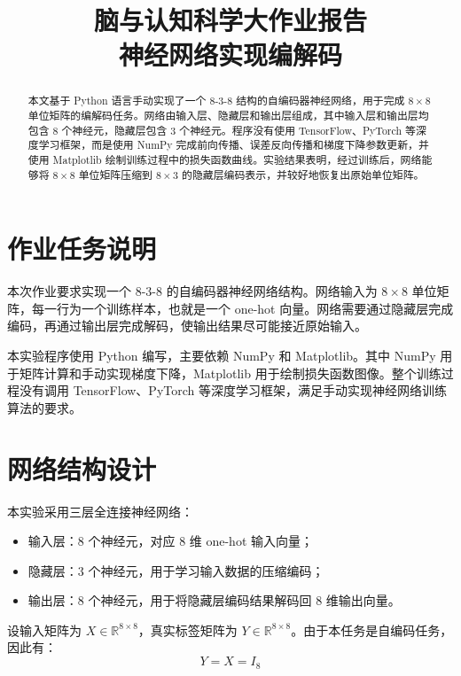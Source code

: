 \documentclass[UTF8,a4paper,12pt]{ctexart}
\title{\textbf{脑与认知科学大作业报告}\\神经网络实现编解码}
\date{}
\begin{document}
\maketitle
\newpage
\begin{abstract}
本文基于 Python 语言手动实现了一个 $8$-$3$-$8$ 结构的自编码器神经网络，用于完成 $8 \times 8$ 单位矩阵的编解码任务。网络由输入层、隐藏层和输出层组成，其中输入层和输出层均包含 $8$ 个神经元，隐藏层包含 $3$ 个神经元。程序没有使用 TensorFlow、PyTorch 等深度学习框架，而是使用 NumPy 完成前向传播、误差反向传播和梯度下降参数更新，并使用 Matplotlib 绘制训练过程中的损失函数曲线。实验结果表明，经过训练后，网络能够将 $8 \times 8$ 单位矩阵压缩到 $8 \times 3$ 的隐藏层编码表示，并较好地恢复出原始单位矩阵。
\end{abstract}

\newpage

\section{作业任务说明}

本次作业要求实现一个 $8$-$3$-$8$ 的自编码器神经网络结构。网络输入为 $8 \times 8$ 单位矩阵，每一行为一个训练样本，也就是一个 one-hot 向量。网络需要通过隐藏层完成编码，再通过输出层完成解码，使输出结果尽可能接近原始输入。

本实验程序使用 Python 编写，主要依赖 NumPy 和 Matplotlib。其中 NumPy 用于矩阵计算和手动实现梯度下降，Matplotlib 用于绘制损失函数图像。整个训练过程没有调用 TensorFlow、PyTorch 等深度学习框架，满足手动实现神经网络训练算法的要求。

\section{网络结构设计}

本实验采用三层全连接神经网络：

\begin{itemize}
    \item 输入层：$8$ 个神经元，对应 $8$ 维 one-hot 输入向量；
    \item 隐藏层：$3$ 个神经元，用于学习输入数据的压缩编码；
    \item 输出层：$8$ 个神经元，用于将隐藏层编码结果解码回 $8$ 维输出向量。
\end{itemize}

设输入矩阵为 $X \in \mathbb{R}^{8 \times 8}$，真实标签矩阵为 $Y \in \mathbb{R}^{8 \times 8}$。由于本任务是自编码任务，因此有：
\begin{equation}
    Y = X = I_8
\end{equation}
\end{document}
